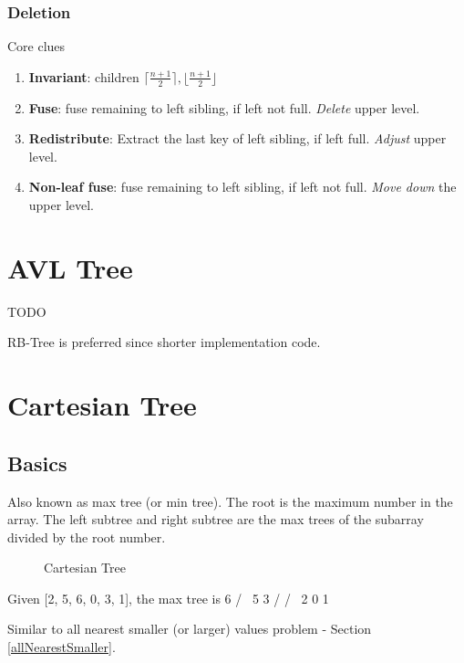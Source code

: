 \subsubsection{Deletion}
Core clues
\begin{enumerate}
\item \textbf{Invariant}: children $\lceil\frac{n+1}{2}\rceil, \lfloor\frac{n+1}{2}\rfloor$
\item \textbf{Fuse}: fuse remaining to left sibling, if left not full. \textit{Delete}
upper level.
\item \textbf{Redistribute}: Extract the last key of left sibling, if left full. \textit{Adjust}
upper level.
\item \textbf{Non-leaf fuse}: fuse remaining to left sibling, if left not full. \textit{Move
down} the upper level.
\end{enumerate}
\section{AVL Tree}
TODO

RB-Tree is preferred since shorter implementation code.

\section{Cartesian Tree}
\subsection{Basics}
Also known as max tree (or min tree). The root is the maximum number in the array. The left subtree and right subtree are the max trees of the subarray divided by the root number.
\begin{figure}[hbtp]
\centering
{}
\caption{Cartesian Tree}
\label{fig:cartesianTree}
\end{figure}
\begin{java}
Given [2, 5, 6, 0, 3, 1], the max tree is
     6
    / \
   5   3
  /   / \
 2   0   1
\end{java}
 Similar to all nearest smaller (or larger) values problem - Section \ref{allNearestSmaller}.

